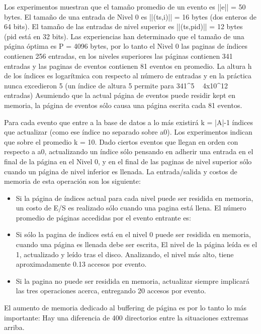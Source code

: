 \documentclass[12pt,a4paper]{report}
\begin{document}
Los experimentos muestran que el tamaño promedio de un evento es ||e|| = 50 bytes.  El tamaño de una entrada de Nivel 0 es ||(ts,i)|| = 16 bytes (dos enteros de 64 bits).  El tamaño de las entradas de nivel superior es ||(ts,pid)|| = 12 bytes (pid está en 32 bits).  Las experiencias han determinado que el tamaño de una página óptima es P = 4096 bytes, por lo tanto el Nivel 0 las paginas de índices contienen 256 entradas, en los niveles superiores las páginas contienen 341 entradas y las paginas de eventos contienen 81 eventos en promedio.  La altura h de los índices es logarítmica con respecto al número de entradas y en la práctica nunca excedieron 5 (un índice de altura 5 permite para 341^5 ~ 4x10^12 entradas)  Asumiendo que la actual página de eventos puede residir {kept} en memoria, la página de eventos sólo causa una página escrita cada 81 eventos.

Para cada evento que entre a la base de datos a lo más existirá k = |A|-1 índices que actualizar (como ese índice no separado sobre a0).  Los experimentos indican que sobre el promedio k = 10.  Dado ciertos eventos que llegan en orden con respecto a a0, actualizando un índice sólo pensando en adherir una entrada en el final de la página en el Nivel 0, y en el final de las paginas de nivel superior sólo cuando un página de nivel inferior es llenada.  La entrada/salida y costos de memoria de esta operación son los siguiente:

\begin{itemize}
	\item Si la página de índices actual para cada nivel puede ser residida en memoria, un costo de E/S es realizado sólo cuando una pagina está llena.  El número promedio de páginas accedidas por el evento entrante es:

	\item Si sólo la pagina de índices está en el nivel 0 puede ser residida en memoria, cuando una página es llenada debe ser escrita, El nivel de la página leída es el 1, actualizado y leído tras el disco.  Analizando, el nivel más alto, tiene aproximadamente 0.13 accesos por evento.  

	\item Si la pagina no puede ser residida en memoria, actualizar siempre implicará las tres operaciones acerca, entregando 20 accesos por evento.
\end{itemize}

	El aumento de memoria dedicado al buffering de página es por lo tanto lo más importante:  Hay una diferencia de  400 directorios entre la situaciones extremas arriba.
\end{document}
